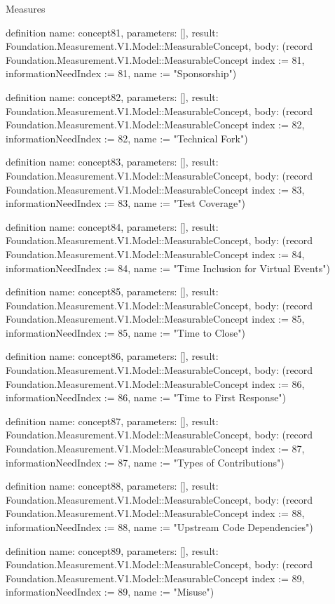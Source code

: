 \begin{lexlean}{Measures}
\begin{semanticmodule}
definition{
  name: concept81,
  parameters: [],
  result: Foundation.Measurement.V1.Model::MeasurableConcept,
  body: (record Foundation.Measurement.V1.Model::MeasurableConcept {index := 81, informationNeedIndex := 81, name := "Sponsorship"})
}

definition{
  name: concept82,
  parameters: [],
  result: Foundation.Measurement.V1.Model::MeasurableConcept,
  body: (record Foundation.Measurement.V1.Model::MeasurableConcept {index := 82, informationNeedIndex := 82, name := "Technical Fork"})
}

definition{
  name: concept83,
  parameters: [],
  result: Foundation.Measurement.V1.Model::MeasurableConcept,
  body: (record Foundation.Measurement.V1.Model::MeasurableConcept {index := 83, informationNeedIndex := 83, name := "Test Coverage"})
}

definition{
  name: concept84,
  parameters: [],
  result: Foundation.Measurement.V1.Model::MeasurableConcept,
  body: (record Foundation.Measurement.V1.Model::MeasurableConcept {index := 84, informationNeedIndex := 84, name := "Time Inclusion for Virtual Events"})
}

definition{
  name: concept85,
  parameters: [],
  result: Foundation.Measurement.V1.Model::MeasurableConcept,
  body: (record Foundation.Measurement.V1.Model::MeasurableConcept {index := 85, informationNeedIndex := 85, name := "Time to Close"})
}

definition{
  name: concept86,
  parameters: [],
  result: Foundation.Measurement.V1.Model::MeasurableConcept,
  body: (record Foundation.Measurement.V1.Model::MeasurableConcept {index := 86, informationNeedIndex := 86, name := "Time to First Response"})
}

definition{
  name: concept87,
  parameters: [],
  result: Foundation.Measurement.V1.Model::MeasurableConcept,
  body: (record Foundation.Measurement.V1.Model::MeasurableConcept {index := 87, informationNeedIndex := 87, name := "Types of Contributions"})
}

definition{
  name: concept88,
  parameters: [],
  result: Foundation.Measurement.V1.Model::MeasurableConcept,
  body: (record Foundation.Measurement.V1.Model::MeasurableConcept {index := 88, informationNeedIndex := 88, name := "Upstream Code Dependencies"})
}

definition{
  name: concept89,
  parameters: [],
  result: Foundation.Measurement.V1.Model::MeasurableConcept,
  body: (record Foundation.Measurement.V1.Model::MeasurableConcept {index := 89, informationNeedIndex := 89, name := "Misuse"})
}


\end{semanticmodule}
\end{lexlean}
